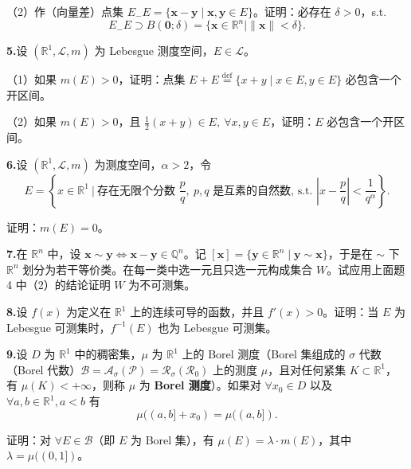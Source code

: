 \documentclass[11pt,a4paper]{article}
\begin{document}
\par\noindent （2）作（向量差）点集 $E_{-}E=\{\boldsymbol{x}-\boldsymbol{y}\mid\boldsymbol{x},\boldsymbol{y}\in E\}$。证明：必存在 $\delta>0$，s.t.
\[E_{-}E\supset B(\boldsymbol{0};\delta)=\{\boldsymbol{x}\in\mathbb R^n\mid\|\boldsymbol{x}\|<\delta\}.\]
\par{}\noindent\hypertarget{review-q5}{}\textbf{5.}\quad 设 $(\mathbb R^1,\mathcal L,m)$ 为 Lebesgue 测度空间，$E\in\mathcal L$。
\par\noindent （1）如果 $m(E)>0$，证明：点集 $E+E\overset{\mathrm{def}}{=}\{x+y\mid x\in E,y\in E\}$ 必包含一个开区间。
\par\noindent （2）如果 $m(E)>0$，且 $\frac12(x+y)\in E,\ \forall x,y\in E$，证明：$E$ 必包含一个开区间。
\par{}\noindent\hypertarget{review-q6}{}\textbf{6.}\quad 设 $(\mathbb R^1,\mathcal L,m)$ 为测度空间，$\alpha>2$，令
\[E=\left\{x\in\mathbb R^1\ \bigg|\ \text{存在无限个分数 }\frac pq,\ p,q\text{ 是互素的自然数, s.t. }\left|x-\frac pq\right|<\frac1{q^\alpha}\right\}.\]
\par\noindent 证明：$m(E)=0$。
\par{}\noindent\hypertarget{review-q7}{}\textbf{7.}\quad 在 $\mathbb R^n$ 中，设 $\boldsymbol{x}\sim\boldsymbol{y}\Leftrightarrow\boldsymbol{x}-\boldsymbol{y}\in\mathbb Q^n$。记 $[\boldsymbol{x}]=\{\boldsymbol{y}\in\mathbb R^n\mid\boldsymbol{y}\sim\boldsymbol{x}\}$，于是在 $\sim$ 下 $\mathbb R^n$ 划分为若干等价类。在每一类中选一元且只选一元构成集合 $W$。试应用上面题 4 中（2）的结论证明 $W$ 为不可测集。
\par{}\noindent\hypertarget{review-q8}{}\textbf{8.}\quad 设 $f(x)$ 为定义在 $\mathbb R^1$ 上的连续可导的函数，并且 $f'(x)>0$。证明：当 $E$ 为 Lebesgue 可测集时，$f^{-1}(E)$ 也为 Lebesgue 可测集。
\par{}\noindent\hypertarget{review-q9}{}\textbf{9.}\quad 设 $D$ 为 $\mathbb R^1$ 中的稠密集，$\mu$ 为 $\mathbb R^1$ 上的 Borel 测度（Borel 集组成的 $\sigma$ 代数（Borel 代数）$\mathcal B=\mathcal A_\sigma(\mathcal P)=\mathcal R_\sigma(\mathcal R_0)$ 上的测度 $\mu$，且对任何紧集 $K\subset\mathbb R^1$，有 $\mu(K)<+\infty$，则称 $\mu$ 为 \textbf{Borel 测度}）。如果对 $\forall x_0\in D$ 以及 $\forall a,b\in\mathbb R^1,a<b$ 有
\[\mu((a,b]+x_0)=\mu((a,b]).\]
\par\noindent 证明：对 $\forall E\in\mathcal B$（即 $E$ 为 Borel 集），有 $\mu(E)=\lambda\cdot m(E)$，其中 $\lambda=\mu((0,1])$。
\end{document}
